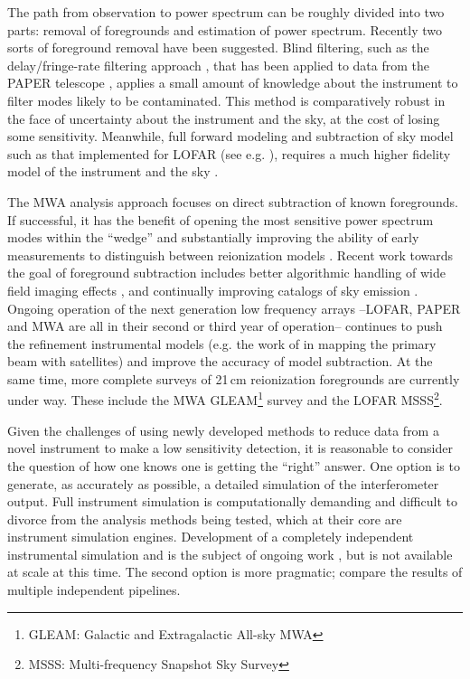 \documentclass[preprint]{aastex}
\begin{document}
The path from observation to power spectrum can be roughly divided into two parts: removal of foregrounds and estimation of power spectrum.  Recently two sorts of foreground removal have been suggested. Blind filtering, such as the delay/fringe-rate filtering approach \citep{Parsons:2012p8896,Liu:2014p10462,Liu:2014p10463},  that has been applied to data from the PAPER telescope \citep{Parsons:2014p10499}, applies a small amount of knowledge about the instrument to filter modes likely to be contaminated.  This method is comparatively robust in the face of uncertainty about the instrument and the sky, at the cost of losing some sensitivity. Meanwhile,  full forward modeling and subtraction of sky model such as that implemented for LOFAR (see e.g. \cite{Jelic:2008p2130,Yatawatta:2013p9699}), requires a much higher fidelity model of the instrument and the sky \citep{Datta:2010p8781,Vedantham:2012p10297}.  

The MWA analysis approach focuses on direct subtraction of known foregrounds.  If successful, it has the benefit of opening the most sensitive power spectrum modes within the ``wedge'' and substantially improving the ability of early measurements to distinguish between reionization models \citep{Beardsley:2013p9952,Pober:2014p10390}. Recent work towards the goal of foreground subtraction includes better algorithmic handling of wide field imaging effects \citep{Tasse:2012p9459,Bhatnagar..2013ApJ,Sullivan:2012p9457,Ord:2010p8442}, and continually improving catalogs of sky emission \citep{deOliveiraCosta:2008p2242,Jacobs:2011p8438,Hurley-walker:2014p45,2014AAS...22342101M}. Ongoing operation of the next generation low frequency arrays --LOFAR, PAPER and MWA are all in their second or third year of operation-- continues to push the refinement instrumental models (e.g. the work of \cite{Neben:2015pxxx} in mapping the primary beam with satellites) and improve the accuracy of model subtraction.  At the same time, more complete surveys of 21\,cm reionization foregrounds are currently under way. These include the MWA GLEAM\footnote{GLEAM: Galactic and Extragalactic All-sky MWA} survey  and the LOFAR MSSS\footnote{MSSS: Multi-frequency Snapshot Sky Survey}.   %



Given the challenges of using newly developed methods to reduce data from a novel instrument to make a low sensitivity detection, it is reasonable to consider the question of how one knows one is getting the ``right'' answer.  One option is to generate, as accurately as possible, a detailed simulation of the interferometer output. Full instrument simulation is computationally demanding and difficult to divorce from the analysis methods being tested, which at their core are instrument simulation engines. Development of a completely independent instrumental simulation and is the subject of ongoing work \citep[see e.g..][]{2015arXiv150207596T}, but is not available at scale at this time.  The second option is more pragmatic; compare the results of multiple independent pipelines.  
\end{document}
